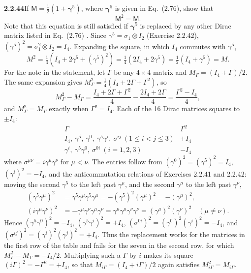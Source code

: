 \par\bigskip
\noindent\textbf{2.2.44}\quad If
$\mathsf{M}=\frac{1}{2}(1+\boldsymbol{\gamma}^{5})$, where
$\boldsymbol{\gamma}^{5}$ is given in Eq.~(2.76), show that
\[
\mathsf{M}^{2}=\mathsf{M}.
\]
Note that this equation is still satisfied if $\boldsymbol{\gamma}^{5}$
is replaced by any other Dirac matrix listed in Eq.~(2.76)
.
\solution
{}
Since $\gamma^5=\sigma_1\otimes I_2$ (Exercise 2.2.42),
$(\gamma^5)^2=\sigma_1^2\otimes I_2=I_4$. Expanding the square, in
which $I_4$ commutes with $\gamma^5$,
\[
M^2=\tfrac14(I_4+2\gamma^5+(\gamma^5)^2)
=\tfrac14(2I_4+2\gamma^5)=\tfrac12(I_4+\gamma^5)=M.
\]
For the note in the statement, let $\Gamma$ be any $4\times4$ matrix
and $M_\Gamma=(I_4+\Gamma)/2$. The same expansion gives
$M_\Gamma^2=\tfrac14(I_4+2\Gamma+\Gamma^2)$, so
\[
M_\Gamma^2-M_\Gamma
=\frac{I_4+2\Gamma+\Gamma^2}{4}-\frac{2I_4+2\Gamma}{4}
=\frac{\Gamma^2-I_4}{4},
\]
and $M_\Gamma^2=M_\Gamma$ exactly when $\Gamma^2=I_4$.
Each of the 16 Dirac matrices squares to $\pm I_4$:
\[
\begin{array}{c|c}
\Gamma&\Gamma^2\\\hline
I_4,\ \gamma^5,\ \gamma^0,\ \gamma^5\gamma^i,\
\sigma^{ij}\ (1\le i<j\le3)&+I_4\\
\gamma^i,\ \gamma^5\gamma^0,\ \sigma^{0i}\ (i=1,2,3)&-I_4
\end{array}
\]
where $\sigma^{\mu\nu}=i\gamma^\mu\gamma^\nu$ for $\mu<\nu$.
The entries follow from $(\gamma^0)^2=(\gamma^5)^2=I_4$,
$(\gamma^i)^2=-I_4$, and the anticommutation relations of
Exercises 2.2.41 and 2.2.42: moving the second $\gamma^5$ to the left
past $\gamma^\mu$, and the second $\gamma^\mu$ to the left past
$\gamma^\nu$,
\[
\begin{aligned}
(\gamma^5\gamma^\mu)^2&=\gamma^5\gamma^\mu\gamma^5\gamma^\mu
=-(\gamma^5)^2(\gamma^\mu)^2=-(\gamma^\mu)^2,\\
(i\gamma^\mu\gamma^\nu)^2&=-\gamma^\mu\gamma^\nu\gamma^\mu\gamma^\nu
=\gamma^\mu\gamma^\mu\gamma^\nu\gamma^\nu=(\gamma^\mu)^2(\gamma^\nu)^2
\quad(\mu\ne\nu).
\end{aligned}
\]
Hence $(\gamma^5\gamma^0)^2=-I_4$, $(\gamma^5\gamma^i)^2=+I_4$,
$(\sigma^{0i})^2=(\gamma^0)^2(\gamma^i)^2=-I_4$, and
$(\sigma^{ij})^2=(\gamma^i)^2(\gamma^j)^2=+I_4$.
Thus the replacement works for the matrices in the first row of the
table and fails for the seven in the second row, for which
$M_\Gamma^2-M_\Gamma=-I_4/2$.
Multiplying such a $\Gamma$ by $i$ makes its square
$(i\Gamma)^2=-\Gamma^2=+I_4$, so that $M_{i\Gamma}=(I_4+i\Gamma)/2$
again satisfies $M_{i\Gamma}^2=M_{i\Gamma}$.


